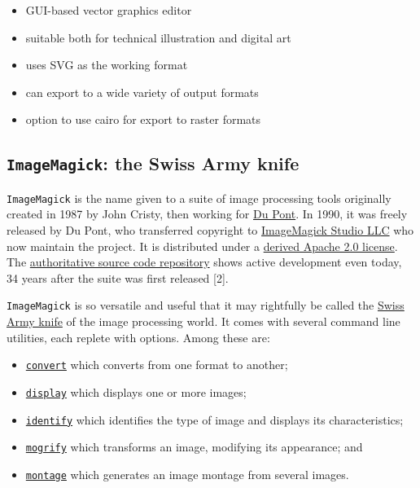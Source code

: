\documentclass[
  11pt,
  british,
  a4paper,
]{article}
\providecommand{\tightlist}{%
  \setlength{\itemsep}{0pt}\setlength{\parskip}{0pt}}
\begin{document}
\begin{enumerate}
  \begin{itemize}
  \tightlist
  \item
    GUI-based vector graphics editor
  \item
    suitable both for technical illustration and digital art
  \item
    uses SVG as the working format
  \item
    can export to a wide variety of output formats
  \item
    option to use cairo for export to raster formats
  \end{itemize}
\end{enumerate}

\hypertarget{imagemagick-the-swiss-army-knife}{%
\subsection{\texorpdfstring{\texttt{ImageMagick}: the Swiss Army
knife}{ImageMagick: the Swiss Army knife}}\label{imagemagick-the-swiss-army-knife}}

\texttt{ImageMagick} is the name given to a suite of image processing
tools originally created in 1987 by John Cristy, then working for
\href{https://www.dupont.com/}{Du Pont}. In 1990, it was freely released
by Du Pont, who transferred copyright to
\href{https://imagemagick.org/script/contact.php}{ImageMagick Studio
LLC} who now maintain the project. It is distributed under a
\href{https://imagemagick.org/script/license.php}{derived Apache 2.0
license}. The
\href{https://github.com/ImageMagick/ImageMagick}{authoritative source
code repository} shows active development even today, 34 years after the
suite was first released {[}2{]}.

\texttt{ImageMagick} is so versatile and useful that it may rightfully
be called the
\href{https://www.thefreedictionary.com/Swiss-army+knife}{Swiss Army
knife} of the image processing world. It comes with several command line
utilities, each replete with options. Among these are:

\begin{itemize}
\tightlist
\item
  \href{https://imagemagick.org/script/convert.php}{\texttt{convert}}
  which converts from one format to another;
\item
  \href{https://imagemagick.org/script/display.php}{\texttt{display}}
  which displays one or more images;
\item
  \href{https://imagemagick.org/script/identify.php}{\texttt{identify}}
  which identifies the type of image and displays its characteristics;
\item
  \href{https://imagemagick.org/script/mogrify.php}{\texttt{mogrify}}
  which transforms an image, modifying its appearance; and
\item
  \href{https://imagemagick.org/script/montage.php}{\texttt{montage}}
  which generates an image montage from several images.
\end{itemize}
\end{document}
